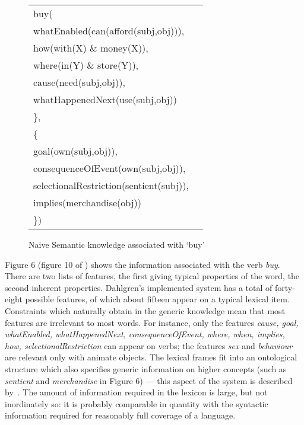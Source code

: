 \begin{figure}[htbp]
  \begin{center}
    \leavevmode
    \small
    \begin{tabular}{ll}
      buy( \hspace*{2mm} &
      \begin{minipage}[t]{110mm}
        \{\\
        whatEnabled(can(afford(subj,obj))),\\
        how(with(X) \& money(X)),\\
        where(in(Y) \& store(Y)),\\
        cause(need(subj,obj)),\\
        whatHappenedNext(use(subj,obj))\\
        \},\\[2mm]
        \{\\
        goal(own(subj,obj)),\\
        consequenceOfEvent(own(subj,obj)),\\
        selectionalRestriction(sentient(subj)),\\
        implies(merchandise(obj))\\
        \})
      \end{minipage}
    \end{tabular}
    \bigskip

    \caption{Naive Semantic knowledge associated with `buy'}
  \end{center}
\end{figure}

Figure 6 (figure 10 of \cite{dahlgren:89:a}) shows the information
associated with
the verb {\it buy\/}. There are two lists of features, the first
giving typical properties of the word, the second inherent properties.
Dahlgren's implemented system has a total of forty-eight possible features,
of which about fifteen appear on a typical lexical item. Constraints which
naturally obtain in the generic knowledge mean that most features are
irrelevant to most words. For instance, only the features {\it cause,
goal, whatEnabled, whatHappenedNext, consequenceOfEvent, where,
when, implies, how, selectionalRestriction\/} can appear on verbs; the
features {\it sex\/} and {\it behaviour\/} are relevant only with animate
objects. The lexical frames fit into an ontological structure which
also specifies generic information on higher concepts (such as
{\it sentient\/} and {\it merchandise\/} in Figure 6) ---
this aspect of the system is described by~\cite{dahlgren:88:a}.
The amount of information required in the lexicon is
large, but not inordinately so: it is probably comparable in quantity
with the syntactic information required for reasonably full coverage of
a language.

